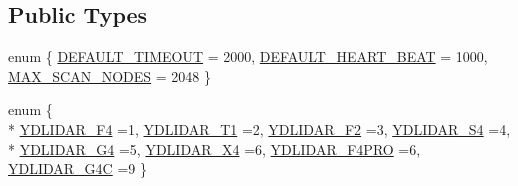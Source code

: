 \subsection*{Public Types}
\begin{DoxyCompactItemize}
\item 
enum \{ \hyperlink{classydlidar_1_1_y_dlidar_driver_a13a4f2dc4067b43794b2c47c06d5d27aa07c79ce96f468ff4b40495ef84584442}{D\+E\+F\+A\+U\+L\+T\+\_\+\+T\+I\+M\+E\+O\+UT} = 2000, 
\hyperlink{classydlidar_1_1_y_dlidar_driver_a13a4f2dc4067b43794b2c47c06d5d27aa94033b4717c83f52cd008fe38b712e21}{D\+E\+F\+A\+U\+L\+T\+\_\+\+H\+E\+A\+R\+T\+\_\+\+B\+E\+AT} = 1000, 
\hyperlink{classydlidar_1_1_y_dlidar_driver_a13a4f2dc4067b43794b2c47c06d5d27aa3db6fc46c7ce55cdf3a968b70e96374a}{M\+A\+X\+\_\+\+S\+C\+A\+N\+\_\+\+N\+O\+D\+ES} = 2048
 \}
\item 
enum \{ \\*
\hyperlink{classydlidar_1_1_y_dlidar_driver_abbb612f1ac6a9f6dfdcfeafb149dd0daa3303d67e56b0dd5a36397a5326965713}{Y\+D\+L\+I\+D\+A\+R\+\_\+\+F4} =1, 
\hyperlink{classydlidar_1_1_y_dlidar_driver_abbb612f1ac6a9f6dfdcfeafb149dd0daa6ea5ed1cde351e4b5df40d1bbd697212}{Y\+D\+L\+I\+D\+A\+R\+\_\+\+T1} =2, 
\hyperlink{classydlidar_1_1_y_dlidar_driver_abbb612f1ac6a9f6dfdcfeafb149dd0daa7d64a3d3e3d3ef6d1db5c0a8740a523a}{Y\+D\+L\+I\+D\+A\+R\+\_\+\+F2} =3, 
\hyperlink{classydlidar_1_1_y_dlidar_driver_abbb612f1ac6a9f6dfdcfeafb149dd0daab1d9ab224053d610e97ebee7236345ba}{Y\+D\+L\+I\+D\+A\+R\+\_\+\+S4} =4, 
\\*
\hyperlink{classydlidar_1_1_y_dlidar_driver_abbb612f1ac6a9f6dfdcfeafb149dd0daa6bd6fb5e1f3ddd4e36ab12e53c114039}{Y\+D\+L\+I\+D\+A\+R\+\_\+\+G4} =5, 
\hyperlink{classydlidar_1_1_y_dlidar_driver_abbb612f1ac6a9f6dfdcfeafb149dd0daa5065807c3aa6a4a731858dda599667b7}{Y\+D\+L\+I\+D\+A\+R\+\_\+\+X4} =6, 
\hyperlink{classydlidar_1_1_y_dlidar_driver_abbb612f1ac6a9f6dfdcfeafb149dd0daa700fca9e58a191c0d1a4d13ae67927e8}{Y\+D\+L\+I\+D\+A\+R\+\_\+\+F4\+P\+RO} =6, 
\hyperlink{classydlidar_1_1_y_dlidar_driver_abbb612f1ac6a9f6dfdcfeafb149dd0daa55a9d7236d51f9d1d38d41cd102be527}{Y\+D\+L\+I\+D\+A\+R\+\_\+\+G4C} =9
 \}
\end{DoxyCompactItemize}
